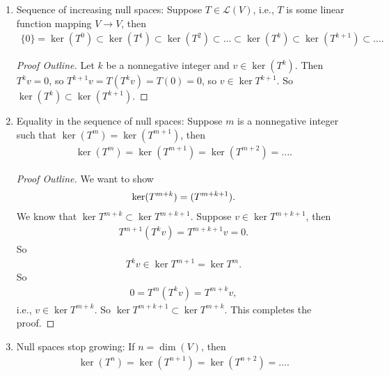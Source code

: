 \documentclass{article}
\theoremstyle{definition}
\newcommand{\lag}{\mathcal{L}}
\begin{document}
\begin{enumerate}
	\item Sequence of increasing null spaces: Suppose $T \in \lag(V)$, i.e., $T$ is some linear function mapping $V\to V$, then
	\begin{align*}
	\{ 0 \} = \ker(T^0) \subset \ker(T^1) \subset \ker(T^2) \subset \dots \subset \ker(T^k) \subset \ker(T^{k+1}) \subset\dots.
	\end{align*} 
	
	\begin{proof}[Proof Outline]
		Let $k$ be a nonnegative integer and $v\in \ker(T^k)$. Then $T^kv = 0$, so $T^{k+1}v = T(T^kv) = T(0) = 0$, so $v\in \ker T^{k+1}$. So $\ker(T^k) \subset \ker(T^{k+1})$. 
	\end{proof}
	\item Equality in the sequence of null spaces: Suppose $m$ is a nonnegative integer such that $\ker(T^m) = \ker(T^{m+1})$, then
	\begin{align*}
	\ker(T^m) = \ker(T^{m+1}) = \ker(T^{m+2}) = \dots.
	\end{align*}
	
	\begin{proof}[Proof Outline]
		We want to show
		\begin{align*}
		\ker(T^{m+k}) = \null(T^{m+k+1}).
		\end{align*}
		We know that $\ker T^{m+k} \subset \ker T^{m+k+1}$. Suppose $v\in \ker T^{m+k+1}$, then
		\begin{align*}
		T^{m+1}(T^kv) = T^{m+k+1}v = 0.
		\end{align*}
		So
		\begin{align*}
		T^kv \in \ker T^{m+1} = \ker T^m.
		\end{align*}
		So
		\begin{align*}
		0 = T^m(T^kv) = T^{m+k}v,
		\end{align*}
		i.e., $v\in \ker T^{m+k}$. So $\ker T^{m+k+1} \subset \ker T^{m+k}$. This completes the proof. 
	\end{proof}
	\item Null spaces stop growing: If $n = \dim(V)$, then
	\begin{align*}
	\ker(T^n) = \ker(T^{n+1}) = \ker(T^{n+2}) = \dots.
	\end{align*}
	

\end{enumerate}
\end{document}
